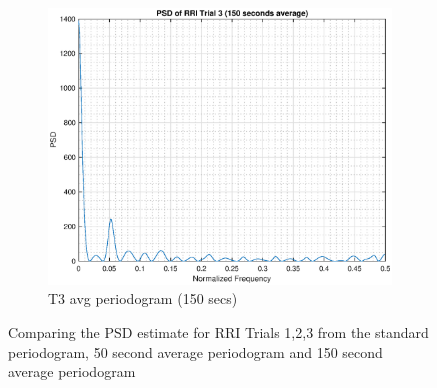 \documentclass{article}
\begin{document}
\begin{figure}[h!]
\begin{subfigure}{0.32\textwidth}
\includegraphics[width = \textwidth]{rr_t3_150}
\caption{T3 avg periodogram (150 secs)}
\label{fig:rr_t3_150}
\end{subfigure}
\caption{Comparing the PSD estimate for RRI Trials 1,2,3 from the standard periodogram, 50 second average periodogram and 150 second average periodogram}
\label{rr_pgm}
\end{figure}
\end{document}
